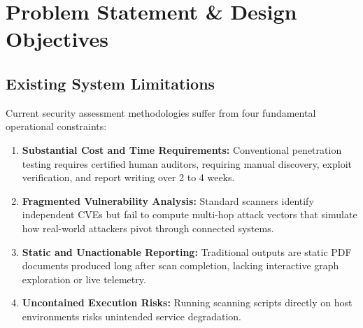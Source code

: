 \documentclass[conference]{IEEEtran}
\begin{document}
\section{Problem Statement \& Design Objectives}

\subsection{Existing System Limitations}
Current security assessment methodologies suffer from four fundamental operational constraints:
\begin{enumerate}
    \item \textbf{Substantial Cost and Time Requirements:} Conventional penetration testing requires certified human auditors, requiring manual discovery, exploit verification, and report writing over 2 to 4 weeks.
    \item \textbf{Fragmented Vulnerability Analysis:} Standard scanners identify independent CVEs but fail to compute multi-hop attack vectors that simulate how real-world attackers pivot through connected systems.
    \item \textbf{Static and Unactionable Reporting:} Traditional outputs are static PDF documents produced long after scan completion, lacking interactive graph exploration or live telemetry.
    \item \textbf{Uncontained Execution Risks:} Running scanning scripts directly on host environments risks unintended service degradation.
\end{enumerate}
\end{document}
